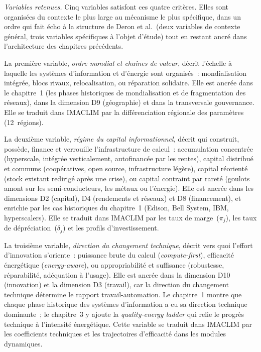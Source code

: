 \emph{Variables retenues.} Cinq variables satisfont ces quatre crit\`eres. Elles sont organis\'ees du contexte le plus large au m\'ecanisme le plus sp\'ecifique, dans un ordre qui fait \'echo \`a la structure de Deron et al.\ (deux variables de contexte g\'en\'eral, trois variables sp\'ecifiques \`a l'objet d'\'etude) tout en restant ancr\'e dans l'architecture des chapitres pr\'ec\'edents.

La premi\`ere variable, \emph{ordre mondial et cha\^ines de valeur}, d\'ecrit l'\'echelle \`a laquelle les syst\`emes d'information et d'\'energie sont organis\'es~: mondialisation int\'egr\'ee, blocs rivaux, relocalisation, ou r\'eparation solidaire. Elle est ancr\'ee dans le chapitre~1 (les phases historiques de mondialisation et de fragmentation des r\'eseaux), dans la dimension D9 (g\'eographie) et dans la transversale gouvernance. Elle se traduit dans IMACLIM par la diff\'erenciation r\'egionale des param\`etres (12~r\'egions).

La deuxi\`eme variable, \emph{r\'egime du capital informationnel}, d\'ecrit qui construit, poss\`ede, finance et verrouille l'infrastructure de calcul~: accumulation concentr\'ee (hyperscale, int\'egr\'ee verticalement, autofinanc\'ee par les rentes), capital distribu\'e et communs (coop\'eratives, open source, infrastructure l\'eg\`ere), capital r\'eorient\'e (stock existant redirig\'e apr\`es une crise), ou capital contraint par raret\'e (goulots amont sur les semi-conducteurs, les m\'etaux ou l'\'energie). Elle est ancr\'ee dans les dimensions D2 (capital), D4 (rendements et r\'eseaux) et D8 (financement), et enrichie par les cas historiques du chapitre~1 (Edison, Bell System, IBM, hyperscalers). Elle se traduit dans IMACLIM par les taux de marge~($\pi_j$), les taux de d\'epr\'eciation~($\delta_j$) et les profils d'investissement.

La troisi\`eme variable, \emph{direction du changement technique}, d\'ecrit vers quoi l'effort d'innovation s'oriente~: puissance brute du calcul (\emph{compute-first}), efficacit\'e \'energ\'etique (\emph{energy-aware}), ou appropriabilit\'e et suffisance (robustesse, r\'eparabilit\'e, ad\'equation \`a l'usage). Elle est ancr\'ee dans la dimension D10 (innovation) et la dimension D3 (travail), car la direction du changement technique d\'etermine le rapport travail-automation. Le chapitre~1 montre que chaque phase historique des syst\`emes d'information a eu sa direction technique dominante~; le chapitre~3 y ajoute la \emph{quality-energy ladder} qui relie le progr\`es technique \`a l'intensit\'e \'energ\'etique. Cette variable se traduit dans IMACLIM par les coefficients techniques et les trajectoires d'efficacit\'e dans les modules dynamiques.

